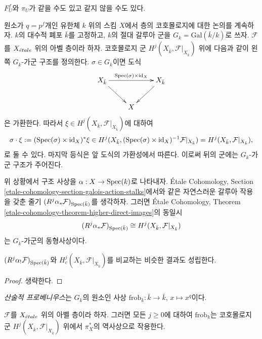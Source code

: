 \begin{remark}
\label{remark-may-be-confusing}
$F^f_U$와 $\pi_U$가 같을 수도 있고 같지 않을 수도 있다.
\end{remark}

\noindent
원소가 $q = p^f$개인 유한체 $k$ 위의 스킴 $X$에서 층의
코호몰로지에 대한 논의를 계속하자. $k$의 대수적 폐포 $\bar k$를
고정하고, $k$의 절대 갈루아 군을
$G_k = \text{Gal}(\bar k/k)$로 쓰자. $\mathcal{F}$를
$X_{\acute{e}tale}$ 위의 아벨 층이라 하자. 코호몰로지 군
$H^j (X_{\bar k}, \mathcal{F}|_{X_{\bar k}})$ 위에 다음과 같이
왼쪽 $G_k$-가군 구조를 정의한다. $\sigma \in G_k$이면 도식
$$
\xymatrix{
X_{\bar k} \ar[rd] \ar[rr]^{\Spec(\sigma) \times \text{id}_X} & &
X_{\bar k} \ar[ld] \\
& X
}
$$
은 가환한다. 따라서
$\xi \in H^j (X_{\bar k}, \mathcal{F}|_{X_{\bar k}})$에 대하여
$$
\sigma \cdot \xi := (\mathop{\mathrm{Spec}}(\sigma) \times \text{id}_X)^*\xi \in
H^j(X_{\bar k}, (\mathop{\mathrm{Spec}}(\sigma) \times \text{id}_X)^{-1}
\mathcal{F}|_{X_{\bar k}})
= H^j (X_{\bar k}, \mathcal{F}|_{X_{\bar k}}),
$$
로 둘 수 있다. 마지막 등식은 앞 도식의 가환성에서 따른다. 이로써
뒤의 군에는 $G_k$-가군 구조가 주어진다.

\begin{lemma}
\label{lemma-two-actions-agree}
위 상황에서 구조 사상을 $\alpha : X \to \mathop{\mathrm{Spec}}(k)$로 나타내자.
\'Etale Cohomology, Section
\ref{etale-cohomology-section-galois-action-stalks}에서와 같은 자연스러운
갈루아 작용을 갖춘 줄기 $(R^j\alpha_*\mathcal{F})_{\mathop{\mathrm{Spec}}(\bar k)}$를
생각하자. 그러면 \'Etale Cohomology, Theorem
\ref{etale-cohomology-theorem-higher-direct-images}의 동일시
$$
(R^j\alpha_*\mathcal{F})_{\mathop{\mathrm{Spec}}(\bar k)} \cong H^j (X_{\bar k},
\mathcal{F}|_{X_{\bar k}})
$$
는 $G_k$-가군의 동형사상이다.
\end{lemma}

\noindent
$(R^j\alpha_!\mathcal{F})_{\mathop{\mathrm{Spec}}(\bar k)}$와
$H^j_c (X_{\bar k}, \mathcal{F}|_{X_{\bar k}})$를 비교하는 비슷한 결과도
성립한다.

\begin{proof}
생략한다.
\end{proof}

\begin{definition}
\label{definition-arithmetic-frobenius}
{\it 산술적 프로베니우스}는 $G_k$의 원소인 사상
$\text{frob}_k : \bar k \to \bar k$, $x \mapsto x^q$이다.
\end{definition}

\begin{theorem}
\label{theorem-geometric-arithmetic-inverse}
$\mathcal{F}$를 $X_{\acute{e}tale}$ 위의 아벨 층이라 하자. 그러면 모든
$j\geq 0$에 대하여 $\text{frob}_k$는 코호몰로지 군
$H^j(X_{\bar k}, \mathcal{F}|_{X_{\bar k}})$ 위에서 $\pi_X^*$의
역사상으로 작용한다.
\end{theorem}

